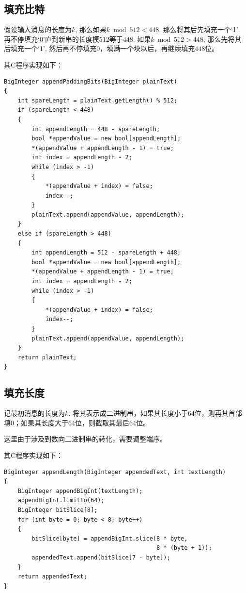 \subsection{填充比特}
假设输入消息的长度为$k$, 那么如果$k\bmod{512}<448$, 那么将其后先填充一个`1', 再不停填充`0'直到新串的长度模$512$等于$448$. 如果$k\bmod{512}>448$, 那么先将其后填充一个`1', 然后再不停填充0，填满一个块以后，再继续填充$448$位。\par
其C程序实现如下：
\begin{prove}
\begin{verbatim}
BigInteger appendPaddingBits(BigInteger plainText)
{
    int spareLength = plainText.getLength() % 512;
    if (spareLength < 448)
    {
        int appendLength = 448 - spareLength;
        bool *appendValue = new bool[appendLength];
        *(appendValue + appendLength - 1) = true;
        int index = appendLength - 2;
        while (index > -1)
        {
            *(appendValue + index) = false;
            index--;
        }
        plainText.append(appendValue, appendLength);
    }
    else if (spareLength > 448)
    {
        int appendLength = 512 - spareLength + 448;
        bool *appendValue = new bool[appendLength];
        *(appendValue + appendLength - 1) = true;
        int index = appendLength - 2;
        while (index > -1)
        {
            *(appendValue + index) = false;
            index--;
        }
        plainText.append(appendValue, appendLength);
    }
    return plainText;
}
\end{verbatim}
\end{prove}
\subsection{填充长度}
记最初消息的长度为$k$. 将其表示成二进制串，如果其长度小于64位，则再其首部填0；如果其长度大于64位，则截取其最后64位。\par
这里由于涉及到数向二进制串的转化，需要调整端序。\par
其C程序实现如下：
\begin{prove}
\begin{verbatim}
BigInteger appendLength(BigInteger appendedText, int textLength)
{
    BigInteger appendBigInt(textLength);
    appendBigInt.limitTo(64);
    BigInteger bitSlice[8];
    for (int byte = 0; byte < 8; byte++)
    {
        bitSlice[byte] = appendBigInt.slice(8 * byte, 
                                            8 * (byte + 1));
        appendedText.append(bitSlice[7 - byte]);
    }
    return appendedText;
}
\end{verbatim}
\end{prove}
